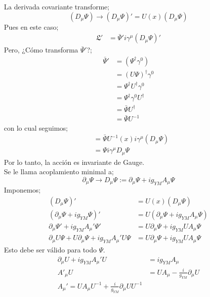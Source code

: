 \documentclass[../main.tex]{subfiles}
\begin{document}
La derivada covariante transforme;
\begin{equation}
  \left( D_\mu \Psi \right)\rightarrow \left( D_\mu \Psi \right)'=U(x) \left( D_\mu\Psi \right)
 \end{equation}
 Pues en este caso;
 \begin{align*}
   \mathfrak{L}' & = \bar{\Psi}' i \gamma^\mu \left( D_\mu \Psi \right)'
 \end{align*}
 Pero, ¿Cómo transforma $\bar{\Psi}'$?;
 \begin{align*}
   \bar{\Psi}' & = \left( \Psi^\dagger \gamma^0 \right) \\
   &  = \left( U\Psi \right)^\dagger \gamma^0 \\
   & = \Psi^\dagger U^\dagger \gamma^0 \\
   & = \Psi^\dagger \gamma^0 U^\dagger \\
   & = \bar{\Psi} U^\dagger \\
   & = \bar{\Psi} U^{-1}
 \end{align*}
 con lo cual seguimos;
 \begin{align*}
   & = \bar{\Psi} U^{-1}(x) i \gamma^\mu \left( D_\mu \Psi \right) \\
   & = \Psi i \gamma^\mu D_\mu \Psi
\end{align*}
Por lo tanto, la acción es invariante de Gauge. \\
Se le llama acoplamiento minimal a;
\begin{equation}
  \partial_\mu \Psi \rightarrow D_\mu \Psi := \partial_\mu \Psi + ig_{YM}A_\mu \Psi
 \end{equation}
 Imponemos;
 \begin{align*}
   \left( D_\mu \Psi \right)' & = U(x)\left( D_\mu \Psi \right) \\
   \left( \partial_\mu \Psi + ig_{YM}\Psi \right)' & = U \left( \partial_\mu \Psi + ig_{YM} A_\mu\Psi \right) \\
   \partial_\mu \Psi' + ig_{YM} A_\mu' \Psi' & = U\partial_\mu \Psi + ig_{YM} U A_\mu \Psi \\
   \partial_\mu U \Psi + U \partial_\mu \Psi + i g_{YM} A_\mu'U\Psi & = U\partial_\mu\Psi + ig_{YM} U A_\mu \Psi
 \end{align*}
 Esto debe ser válido para todo $\Psi$.
 \begin{align*}
   \partial_\mu U + ig_{YM} A_\mu'U & = ig_{YM}A_\mu \\
   A'_\mu U & = UA_\mu - \frac{i}{g_{YM}} \partial_\mu U \\
   A_\mu' = UA_\mu U^{-1} + \frac{i}{g_{YM}} \partial_\mu U U^{-1}
 \end{align*}
\end{document}
